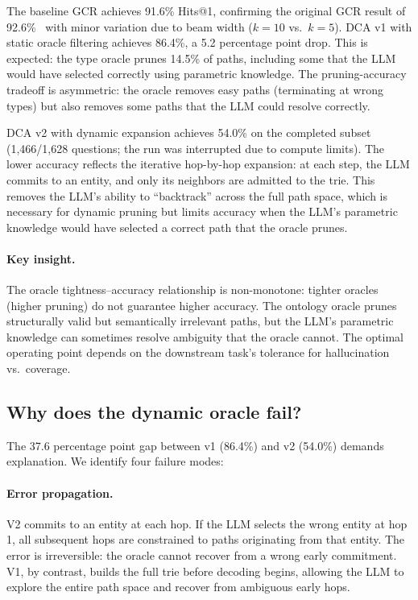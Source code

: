 \documentclass[11pt,twoside]{article}
\begin{document}
The baseline GCR achieves 91.6\% Hits@1, confirming the original GCR result of 92.6\%~\citep{luo2025-graph-constrained-reasoning} with minor variation due to beam width ($k=10$ vs.\ $k=5$). DCA v1 with static oracle filtering achieves 86.4\%, a 5.2 percentage point drop. This is expected: the type oracle prunes 14.5\% of paths, including some that the LLM would have selected correctly using parametric knowledge. The pruning-accuracy tradeoff is asymmetric: the oracle removes easy paths (terminating at wrong types) but also removes some paths that the LLM could resolve correctly.

DCA v2 with dynamic expansion achieves 54.0\% on the completed subset (1,466/1,628 questions; the run was interrupted due to compute limits). The lower accuracy reflects the iterative hop-by-hop expansion: at each step, the LLM commits to an entity, and only its neighbors are admitted to the trie. This removes the LLM's ability to ``backtrack'' across the full path space, which is necessary for dynamic pruning but limits accuracy when the LLM's parametric knowledge would have selected a correct path that the oracle prunes.

\paragraph{Key insight.} The oracle tightness--accuracy relationship is non-monotone: tighter oracles (higher pruning) do not guarantee higher accuracy. The ontology oracle prunes structurally valid but semantically irrelevant paths, but the LLM's parametric knowledge can sometimes resolve ambiguity that the oracle cannot. The optimal operating point depends on the downstream task's tolerance for hallucination vs.\ coverage.

\subsection{Why does the dynamic oracle fail?}

The 37.6 percentage point gap between v1 (86.4\%) and v2 (54.0\%) demands explanation. We identify four failure modes:

\paragraph{Error propagation.} V2 commits to an entity at each hop. If the LLM selects the wrong entity at hop 1, all subsequent hops are constrained to paths originating from that entity. The error is irreversible: the oracle cannot recover from a wrong early commitment. V1, by contrast, builds the full trie before decoding begins, allowing the LLM to explore the entire path space and recover from ambiguous early hops.
\end{document}
